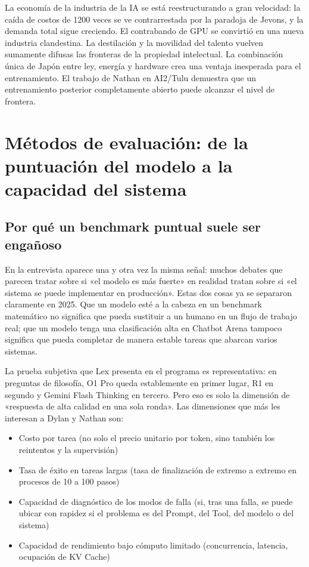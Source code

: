 \documentclass[a4paper]{article}
\begin{document}
La economía de la industria de la IA se está reestructurando a gran velocidad: la caída de costos de 1200 veces se ve contrarrestada por la paradoja de Jevons, y la demanda total sigue creciendo. El contrabando de GPU se convirtió en una nueva industria clandestina. La destilación y la movilidad del talento vuelven sumamente difusas las fronteras de la propiedad intelectual. La combinación única de Japón entre ley, energía y hardware crea una ventaja inesperada para el entrenamiento. El trabajo de Nathan en AI2/Tulu demuestra que un entrenamiento posterior completamente abierto puede alcanzar el nivel de frontera.
\section{Métodos de evaluación: de la puntuación del modelo a la capacidad del sistema}

\subsection{Por qué un benchmark puntual suele ser engañoso}

En la entrevista aparece una y otra vez la misma señal: muchos debates que parecen tratar sobre si «el modelo es más fuerte» en realidad tratan sobre si «el sistema se puede implementar en producción». Estas dos cosas ya se separaron claramente en 2025. Que un modelo esté a la cabeza en un benchmark matemático no significa que pueda sustituir a un humano en un flujo de trabajo real; que un modelo tenga una clasificación alta en Chatbot Arena tampoco significa que pueda completar de manera estable tareas que abarcan varios sistemas.

La prueba subjetiva que Lex presenta en el programa es representativa: en preguntas de filosofía, O1 Pro queda establemente en primer lugar, R1 en segundo y Gemini Flash Thinking en tercero. Pero eso es solo la dimensión de «respuesta de alta calidad en una sola ronda». Las dimensiones que más les interesan a Dylan y Nathan son:
\begin{itemize}
    \item Costo por tarea (no solo el precio unitario por token, sino también los reintentos y la supervisión)
    \item Tasa de éxito en tareas largas (tasa de finalización de extremo a extremo en procesos de 10 a 100 pasos)
    \item Capacidad de diagnóstico de los modos de falla (si, tras una falla, se puede ubicar con rapidez si el problema es del Prompt, del Tool, del modelo o del sistema)
    \item Capacidad de rendimiento bajo cómputo limitado (concurrencia, latencia, ocupación de KV Cache)
\end{itemize}
\end{document}
